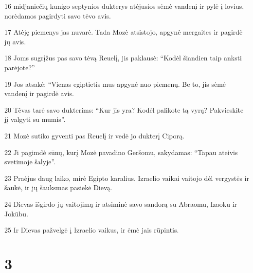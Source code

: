\par 16 midjaniečių kunigo septynios dukterys atėjusios sėmė vandenį ir pylė į lovius, norėdamos pagirdyti savo tėvo avis. 
\par 17 Atėję piemenys jas nuvarė. Tada Mozė atsistojo, apgynė mergaites ir pagirdė jų avis. 
\par 18 Joms sugrįžus pas savo tėvą Reuelį, jis paklausė: “Kodėl šiandien taip anksti parėjote?” 
\par 19 Jos atsakė: “Vienas egiptietis mus apgynė nuo piemenų. Be to, jis sėmė vandenį ir pagirdė avis. 
\par 20 Tėvas tarė savo dukterims: “Kur jis yra? Kodėl palikote tą vyrą? Pakvieskite jį valgyti su mumis”. 
\par 21 Mozė sutiko gyventi pas Reuelį ir vedė jo dukterį Ciporą. 
\par 22 Ji pagimdė sūnų, kurį Mozė pavadino Geršomu, sakydamas: “Tapau ateivis svetimoje šalyje”. 
\par 23 Praėjus daug laiko, mirė Egipto karalius. Izraelio vaikai vaitojo dėl vergystės ir šaukė, ir jų šauksmas pasiekė Dievą. 
\par 24 Dievas išgirdo jų vaitojimą ir atsiminė savo sandorą su Abraomu, Izaoku ir Jokūbu. 
\par 25 Ir Dievas pažvelgė į Izraelio vaikus, ir ėmė jais rūpintis.



\chapter{3}

